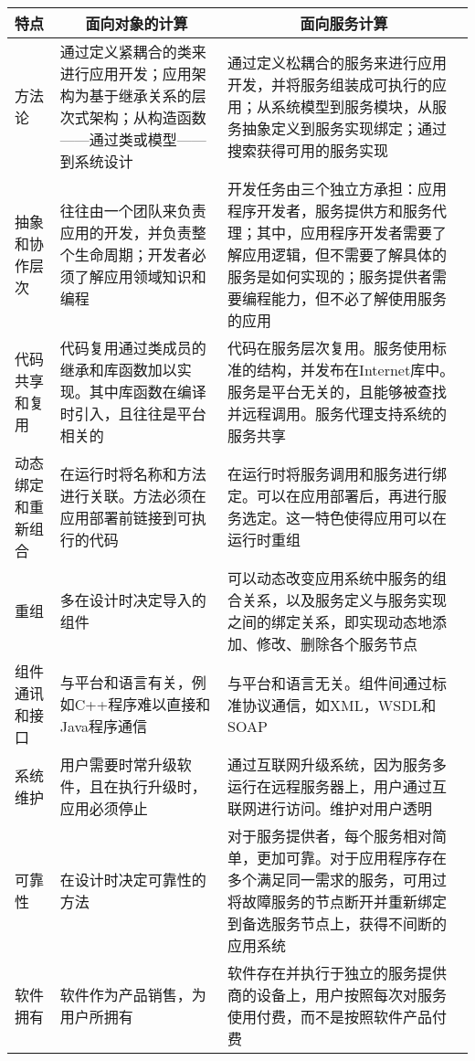 \begin{spacing}{1.2}
    \centering
    \begin{longtable}{|m{1.8cm}<{\centering}|m{6.5cm}|m{6.5cm}|}
		\hline
    \textbf{特点} & \multicolumn{1}{c|}{\textbf{面向对象的计算}}                   & \multicolumn{1}{c|}{\textbf{面向服务计算}}                                                          \\ \hline
    方法论         & 通过定义紧耦合的类来进行应用开发；应用架构为基于继承关系的层次式架构；从构造函数——通过类或模型——到系统设计 & 通过定义松耦合的服务来进行应用开发，并将服务组装成可执行的应用；从系统模型到服务模块，从服务抽象定义到服务实现绑定；通过搜索获得可用的服务实现                       \\ \hline
    抽象和协作层次     & 往往由一个团队来负责应用的开发，并负责整个生命周期；开发者必须了解应用领域知识和编程              & 开发任务由三个独立方承担：应用程序开发者，服务提供方和服务代理；其中，应用程序开发者需要了解应用逻辑，但不需要了解具体的服务是如何实现的；服务提供者需要编程能力，但不必了解使用服务的应用 \\ \hline
    代码共享和复用     & 代码复用通过类成员的继承和库函数加以实现。其中库函数在编译时引入，且往往是平台相关的              & 代码在服务层次复用。服务使用标准的结构，并发布在Internet库中。服务是平台无关的，且能够被查找并远程调用。服务代理支持系统的服务共享                         \\ \hline
    动态绑定和重新组合   & 在运行时将名称和方法进行关联。方法必须在应用部署前链接到可执行的代码                      & 在运行时将服务调用和服务进行绑定。可以在应用部署后，再进行服务选定。这一特色使得应用可以在运行时重组                                            \\ \hline
    重组          & 多在设计时决定导入的组件                                            & 可以动态改变应用系统中服务的组合关系，以及服务定义与服务实现之间的绑定关系，即实现动态地添加、修改、删除各个服务节点                                    \\ \hline
    组件通讯和接口     & 与平台和语言有关，例如C++程序难以直接和Java程序通信                           & 与平台和语言无关。组件间通过标准协议通信，如XML，WSDL和SOAP                                                           \\ \hline
    系统维护        & 用户需要时常升级软件，且在执行升级时，应用必须停止                               & 通过互联网升级系统，因为服务多运行在远程服务器上，用户通过互联网进行访问。维护对用户透明                                                  \\ \hline
    可靠性         & 在设计时决定可靠性的方法                                            & 对于服务提供者，每个服务相对简单，更加可靠。对于应用程序存在多个满足同一需求的服务，可用过将故障服务的节点断开并重新绑定到备选服务节点上，获得不间断的应用系统               \\ \hline
    软件拥有        & 软件作为产品销售，为用户所拥有                                         & 软件存在并执行于独立的服务提供商的设备上，用户按照每次对服务使用付费，而不是按照软件产品付费                                                \\ \hline
    \end{longtable}
	\end{spacing}
\vspace{-1em}
